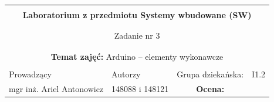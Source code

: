 \documentclass[polish,a4paper]{article}
\begin{document}
	\begin{center}
		\begin{tabular}{ p{} p{} p{} p{} p{} }
			
			&   &   &   &  \\
			\hline
			\multicolumn{5}{|c|}{}\\[-1ex]
			\multicolumn{5}{|c|}{{\LARGE \textbf{Laboratorium z przedmiotu Systemy wbudowane (SW)}}}\\
			\multicolumn{5}{|c|}{}\\[-1ex]
			\hline
			\hline
			
			\multicolumn{5}{|c|}{}\\[-1ex]
			\multicolumn{5}{|c|}{{\LARGE Zadanie nr 3}}\\
			\multicolumn{5}{|c|}{}\\[-1ex]
			\hline
			\hline
			
			\multicolumn{5}{|c|}{}\\[-1ex]
			\multicolumn{5}{|c|}{{\textbf{Temat zajęć:} Arduino – elementy wykonawcze}}\\
			\multicolumn{5}{|c|}{}\\[-1ex]
			\hline
			\hline
			
			\multicolumn{1}{|l|}{Prowadzący} &
			\multicolumn{2}{|l|}{Autorzy} &
			\multicolumn{1}{|l|}{Grupa dziekańska:}
			&
			\multicolumn{1}{|l|}{I1.2} \\
			\multicolumn{1}{|c|}{mgr inż. Ariel Antonowicz} &
			\multicolumn{2}{|c|}{148088 i 148121} &
			\multicolumn{1}{|c|}{\textbf{Ocena:}} &
			\multicolumn{1}{|c|}{}\\
			\hline
			\hline
		\end{tabular}
	\end{center}
	
\end{document}
